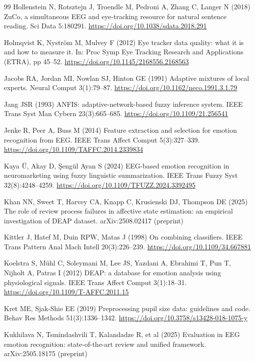 \documentclass[11pt,a4paper]{article}
\begin{document}
\begin{thebibliography}{99}
 Hollenstein N, Rotsztejn J, Troendle M, Pedroni A, Zhang C, Langer N (2018) ZuCo, a simultaneous EEG and eye-tracking resource for natural sentence reading. Sci Data 5:180291. \url{https://doi.org/10.1038/sdata.2018.291}

 Holmqvist K, Nystr\"om M, Mulvey F (2012) Eye tracker data quality: what it is and how to measure it. In: Proc Symp Eye Tracking Research and Applications (ETRA), pp 45--52. \url{https://doi.org/10.1145/2168556.2168563}

 Jacobs RA, Jordan MI, Nowlan SJ, Hinton GE (1991) Adaptive mixtures of local experts. Neural Comput 3(1):79--87. \url{https://doi.org/10.1162/neco.1991.3.1.79}

 Jang JSR (1993) ANFIS: adaptive-network-based fuzzy inference system. IEEE Trans Syst Man Cybern 23(3):665--685. \url{https://doi.org/10.1109/21.256541}

 Jenke R, Peer A, Buss M (2014) Feature extraction and selection for emotion recognition from EEG. IEEE Trans Affect Comput 5(3):327--339. \url{https://doi.org/10.1109/TAFFC.2014.2339834}

 Kaya \"U, Akay D, \c{S}eng\"ul Ayan S (2024) EEG-based emotion recognition in neuromarketing using fuzzy linguistic summarization. IEEE Trans Fuzzy Syst 32(8):4248--4259. \url{https://doi.org/10.1109/TFUZZ.2024.3392495}

 Khan NN, Sweet T, Harvey CA, Knapp C, Krusienski DJ, Thompson DE (2025) The role of review process failures in affective state estimation: an empirical investigation of DEAP dataset. arXiv:2508.02417 (preprint)

 Kittler J, Hatef M, Duin RPW, Matas J (1998) On combining classifiers. IEEE Trans Pattern Anal Mach Intell 20(3):226--239. \url{https://doi.org/10.1109/34.667881}

 Koelstra S, M\"uhl C, Soleymani M, Lee JS, Yazdani A, Ebrahimi T, Pun T, Nijholt A, Patras I (2012) DEAP: a database for emotion analysis using physiological signals. IEEE Trans Affect Comput 3(1):18--31. \url{https://doi.org/10.1109/T-AFFC.2011.15}

 Kret ME, Sjak-Shie EE (2019) Preprocessing pupil size data: guidelines and code. Behav Res Methods 51(3):1336--1342. \url{https://doi.org/10.3758/s13428-018-1075-y}

 Kukhilava N, Tsmindashvili T, Kalandadze R, et al (2025) Evaluation in EEG emotion recognition: state-of-the-art review and unified framework. arXiv:2505.18175 (preprint)


\end{thebibliography}
\end{document}

